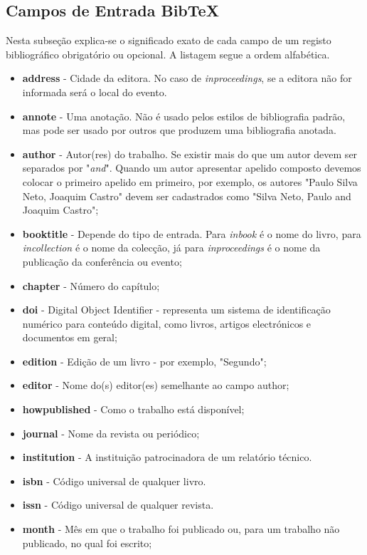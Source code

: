 \documentclass{article}%
\begin{document}
\subsection{Campos de Entrada Bib\TeX}

Nesta subseção explica-se o significado exato de cada campo de um registo bibliográfico obrigatório ou opcional.
A listagem segue a ordem alfabética.

\begin{itemize}
  \item \textbf{address} -  Cidade da editora. No caso de \emph{inproceedings}, se a editora não for informada será o local do evento.
  \item \textbf{annote} - Uma anotação. Não é usado pelos estilos de bibliografia padrão, mas pode ser usado por outros que produzem uma bibliografia anotada.
  \item \textbf{author} - Autor(res) do trabalho. Se existir mais do que um autor devem ser separados por "\emph{and}".
                        Quando um autor apresentar apelido composto devemos colocar o primeiro apelido em primeiro, por exemplo, os autores "Paulo Silva Neto, Joaquim Castro" devem ser cadastrados como "Silva{ }Neto, Paulo and Joaquim Castro";
  \item \textbf{booktitle} - Depende do tipo de entrada. Para \emph{inbook} é o nome do livro, para \emph{incollection} é o nome da colecção, já para \emph{inproceedings} é o nome da publicação da conferência ou evento;
  \item \textbf{chapter} - Número do capítulo;
  \item \textbf{doi} - Digital Object Identifier - representa um sistema de identificação numérico para conteúdo digital, como livros, artigos electrónicos e documentos em geral;
  \item \textbf{edition} - Edição de um livro - por exemplo, "Segundo";
  \item \textbf{editor} -  Nome do(s) editor(es) semelhante ao campo author;
  \item \textbf{howpublished} -  Como o trabalho está disponível;
  \item \textbf{journal} - Nome da revista ou periódico;
  \item \textbf{institution} - A instituição patrocinadora de um relatório técnico.
  \item \textbf{isbn} - Código universal de qualquer livro.
  \item \textbf{issn} - Código universal de qualquer revista.
  \item \textbf{month} - Mês  em que o trabalho foi publicado ou, para um trabalho não publicado, no qual foi escrito;

\end{itemize}
\end{document}
